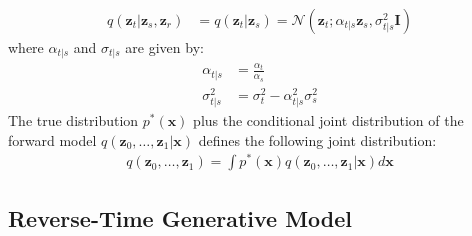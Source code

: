 \documentclass[ oneside,%
                    author={George Herbert},
                    degree={MSci},
                     title={Video Diffusion Models for Climate Simulations},
                  subtitle={}]{dissertation}
\begin{document}
\begin{align}
      q(\mathbf{z}_t|\mathbf{z}_s,\mathbf{z}_r)&=q(\mathbf{z}_t|\mathbf{z}_s)=\mathcal{N}\left(\mathbf{z}_t; \alpha_{t|s}\mathbf{z}_s, \sigma_{t|s}^2\mathbf{I}\right)
\end{align}
where $\alpha_{t|s}$ and $\sigma_{t|s}$ are given by:
\begin{align}
      \alpha_{t|s} &= \frac{\alpha_t}{\alpha_s}\\
      \sigma_{t|s}^2 &= \sigma_t^2-\alpha_{t|s}^2\sigma_s^2
\end{align}
The true distribution $p^*(\mathbf{x})$ plus the conditional joint distribution of the forward model $q(\mathbf{z}_0,\ldots,\mathbf{z}_1|\mathbf{x})$ defines the following joint distribution:
\begin{align}
      q(\mathbf{z}_0,\ldots,\mathbf{z}_1)=\int p^*(\mathbf{x}) q(\mathbf{z}_0,\ldots,\mathbf{z}_1|\mathbf{x}) d\mathbf{x}
\end{align}

\subsection{Reverse-Time Generative Model}
\label{sec:background_diffusion_reverse}
\end{document}
